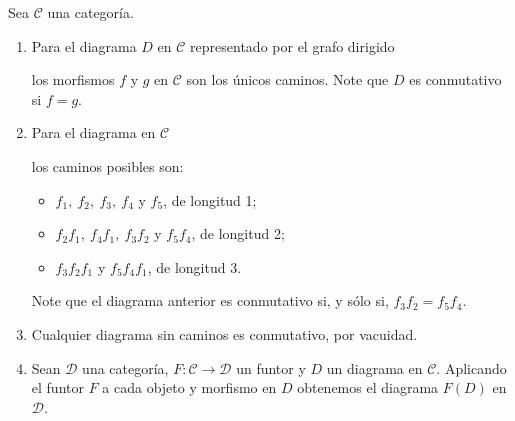 \documentclass[tesis]{subfiles}
\begin{document}
\begin{Ejem}
    Sea $\mathscr{C}$ una categoría.

    \begin{enumerate}[label=(\arabic*)]
    
        \item Para el diagrama $D$ en $\mathscr{C}$ representado por el grafo dirigido
            \begin{center}
            \end{center}
            los morfismos $f$ y $g$ en $\mathscr{C}$ son los únicos caminos. Note que $D$ es conmutativo si $f=g$.

        \item Para el diagrama en $\mathscr{C}$
            \begin{center}
            \end{center}
            los caminos posibles son: 

            \begin{itemize}
            
                \item $f_1, \ f_2, \ f_3, \ f_4$ y $f_5$, de longitud 1;

                \item $f_2f_1, \ f_4f_1, \ f_3f_2$ y $f_5f_4$, de longitud 2;

                \item $f_3f_2f_1$ y $f_5f_4f_1$, de longitud 3.
            \end{itemize}

            Note que el diagrama anterior es conmutativo si, y sólo si, $f_3f_2 = f_5f_4$.

        \item Cualquier diagrama sin caminos es conmutativo, por vacuidad.

        \item Sean $\mathscr{D}$ una categoría, $F:\mathscr{C}\to \mathscr{D}$ un funtor y $D$ un diagrama en $\mathscr{C}$. Aplicando el funtor $F$ a cada objeto y morfismo en $D$ obtenemos el diagrama $F(D)$ en $\mathscr{D}$.
            
    \end{enumerate}
\end{Ejem}
\end{document}

